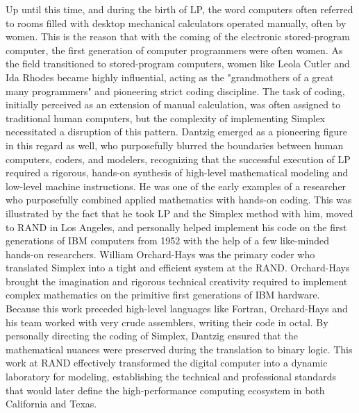Up until this time, and during the birth of LP, the word computers often referred to rooms filled with desktop mechanical calculators operated manually, often by women. This is the reason that with the coming of the electronic stored-program computer, the first generation of computer programmers were often women. As the field transitioned to stored-program computers, women like Leola Cutler and Ida Rhodes became highly influential, acting as the "grandmothers of a great many programmers" and pioneering strict coding discipline. The task of coding, initially perceived as an extension of manual calculation, was often assigned to traditional human computers, but the complexity of implementing Simplex necessitated a disruption of this pattern. Dantzig emerged as a pioneering figure in this regard as well, who purposefully blurred the boundaries between human computers, coders, and modelers, recognizing that the successful execution of LP required a rigorous, hands-on synthesis of high-level mathematical modeling and low-level machine instructions. He was one of the early examples of a researcher who purposefully combined applied mathematics with hands-on coding. This was illustrated by the fact that he took LP and the Simplex method with him, moved to RAND in Los Angeles, and personally helped implement his code on the first generations of IBM computers from 1952 with the help of a few like-minded hands-on researchers. William Orchard-Hays was the primary coder who translated Simplex into a tight and efficient system at the RAND. Orchard-Hays brought the imagination and rigorous technical creativity required to implement complex mathematics on the primitive first generations of IBM hardware. Because this work preceded high-level languages like Fortran, Orchard-Hays and his team worked with very crude assemblers, writing their code in octal. By personally directing the coding of Simplex, Dantzig ensured that the mathematical nuances were preserved during the translation to binary logic. This work at RAND effectively transformed the digital computer into a dynamic laboratory for modeling, establishing the technical and professional standards that would later define the high-performance computing ecosystem in both California and Texas. \cite{grierWhenComputersWere2005}

